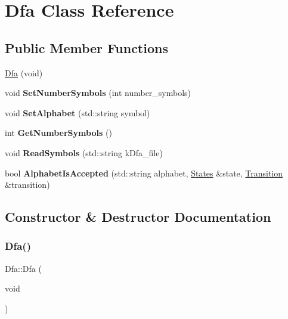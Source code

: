 \hypertarget{classDfa}{}\section{Dfa Class Reference}
\label{classDfa}
\subsection*{Public Member Functions}
\begin{DoxyCompactItemize}
\item 
\hyperlink{classDfa_a89c2bffef86525363c275b3fe60fc57f}{Dfa} (void)
\item 
\mbox{\label{classDfa_ac022a12536c2a855066fdfd85fba5ed9}} 
void {\bfseries Set\+Number\+Symbols} (int number\+\_\+symbols)
\item 
\mbox{\label{classDfa_a094525697d759c4b5b36bf562d920916}} 
void {\bfseries Set\+Alphabet} (std\+::string symbol)
\item 
\mbox{\label{classDfa_a21239eac92e02d748bdc5cee0c52b831}} 
int {\bfseries Get\+Number\+Symbols} ()
\item 
\mbox{\label{classDfa_ac596e302028cb885e1a8eae2f1f60e69}} 
void {\bfseries Read\+Symbols} (std\+::string k\+Dfa\+\_\+file)
\item 
\mbox{\label{classDfa_a0de3553aca8cf0329bf12a7b1acaa291}} 
bool {\bfseries Alphabet\+Is\+Accepted} (std\+::string alphabet, \hyperlink{classStates}{States} \&state, \hyperlink{classTransition}{Transition} \&transition)
\end{DoxyCompactItemize}


\subsection{Constructor \& Destructor Documentation}
\mbox{\label{classDfa_a89c2bffef86525363c275b3fe60fc57f}} 
\subsubsection{\texorpdfstring{Dfa()}{Dfa()}}
{\footnotesize\ttfamily Dfa\+::\+Dfa (\begin{DoxyParamCaption}\item[{void}]{ }\end{DoxyParamCaption})}

